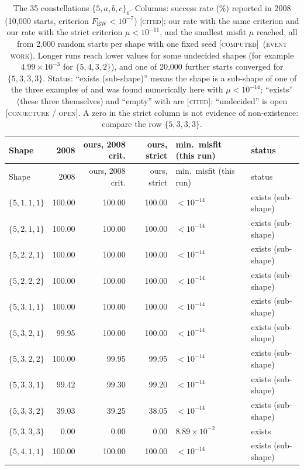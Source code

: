 \documentclass[11pt]{article}
\newcommand{\st}[1]{\textsc{[#1]}}
\newcommand{\stcomp}{\st{computed}}
\newcommand{\stcited}{\st{cited}}
\newcommand{\stconj}{\st{conjecture / open}}
\newcommand{\event}{\textsc{(event work)}}
\theoremstyle{definition}
\theoremstyle{remark}
\begin{document}
{\small
\setlength{\tabcolsep}{4pt}
\begin{longtable}{@{}lrrrll@{}}
\caption{The 35 constellations $\{5,a,b,c\}_6$. Columns: success rate (\%) reported in 2008 \cite{BW08} (10{,}000 starts, criterion $F_{\mathrm{BW}}<10^{-7}$) \stcited; our rate with the same criterion and our rate with the strict criterion $\mu<10^{-11}$, and the smallest misfit $\mu$ reached, all from 2{,}000 random starts per shape with one fixed seed \stcomp\ \event. Longer runs reach lower values for some undecided shapes (for example $4.99\times10^{-3}$ for $\{5,4,3,2\}$), and one of 20{,}000 further starts converged for $\{5,3,3,3\}$. Status: ``exists (sub-shape)'' means the shape is a sub-shape of one of the three examples of \cite{CWT} and was found numerically here with $\mu<10^{-14}$; ``exists'' (these three themselves) and ``empty'' with \cite{CWT} are \stcited; ``undecided'' is open \stconj. A zero in the strict column is not evidence of non-existence: compare the row $\{5,3,3,3\}$.}\label{tab:const}\\
\toprule
Shape & 2008 & ours, 2008 crit. & ours, strict & min.\ misfit (this run) & status\\
\midrule
\endfirsthead
\toprule
Shape & 2008 & ours, 2008 crit. & ours, strict & min.\ misfit (this run) & status\\
\midrule
\endhead
\bottomrule
\endlastfoot
$\{5,1,1,1\}$ & 100.00 & 100.00 & 100.00 & $<10^{-14}$ & exists (sub-shape)\\
$\{5,2,1,1\}$ & 100.00 & 100.00 & 100.00 & $<10^{-14}$ & exists (sub-shape)\\
$\{5,2,2,1\}$ & 100.00 & 100.00 & 100.00 & $<10^{-14}$ & exists (sub-shape)\\
$\{5,2,2,2\}$ & 100.00 & 100.00 & 100.00 & $<10^{-14}$ & exists (sub-shape)\\
$\{5,3,1,1\}$ & 100.00 & 100.00 & 100.00 & $<10^{-14}$ & exists (sub-shape)\\
$\{5,3,2,1\}$ & 99.95 & 100.00 & 100.00 & $<10^{-14}$ & exists (sub-shape)\\
$\{5,3,2,2\}$ & 100.00 & 99.95 & 99.95 & $<10^{-14}$ & exists (sub-shape)\\
$\{5,3,3,1\}$ & 99.42 & 99.30 & 99.20 & $<10^{-14}$ & exists (sub-shape)\\
$\{5,3,3,2\}$ & 39.03 & 39.25 & 38.05 & $<10^{-14}$ & exists (sub-shape)\\
$\{5,3,3,3\}$ & 0.00 & 0.00 & 0.00 & $8.89\times10^{-2}$ & exists \cite{CWT}\\
$\{5,4,1,1\}$ & 100.00 & 100.00 & 100.00 & $<10^{-14}$ & exists (sub-shape)\\

\end{longtable}}
\end{document}

